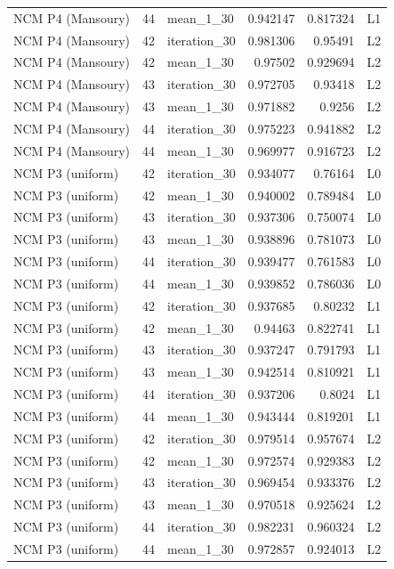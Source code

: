 \begin{table}[htbp!]
\begin{tabular}{lrlrrl}
NCM P4 (Mansoury) & 44 & mean\_1\_30 & 0.942147 & 0.817324 & L1 \\
NCM P4 (Mansoury) & 42 & iteration\_30 & 0.981306 & 0.95491 & L2 \\
NCM P4 (Mansoury) & 42 & mean\_1\_30 & 0.97502 & 0.929694 & L2 \\
NCM P4 (Mansoury) & 43 & iteration\_30 & 0.972705 & 0.93418 & L2 \\
NCM P4 (Mansoury) & 43 & mean\_1\_30 & 0.971882 & 0.9256 & L2 \\
NCM P4 (Mansoury) & 44 & iteration\_30 & 0.975223 & 0.941882 & L2 \\
NCM P4 (Mansoury) & 44 & mean\_1\_30 & 0.969977 & 0.916723 & L2 \\
NCM P3 (uniform) & 42 & iteration\_30 & 0.934077 & 0.76164 & L0 \\
NCM P3 (uniform) & 42 & mean\_1\_30 & 0.940002 & 0.789484 & L0 \\
NCM P3 (uniform) & 43 & iteration\_30 & 0.937306 & 0.750074 & L0 \\
NCM P3 (uniform) & 43 & mean\_1\_30 & 0.938896 & 0.781073 & L0 \\
NCM P3 (uniform) & 44 & iteration\_30 & 0.939477 & 0.761583 & L0 \\
NCM P3 (uniform) & 44 & mean\_1\_30 & 0.939852 & 0.786036 & L0 \\
NCM P3 (uniform) & 42 & iteration\_30 & 0.937685 & 0.80232 & L1 \\
NCM P3 (uniform) & 42 & mean\_1\_30 & 0.94463 & 0.822741 & L1 \\
NCM P3 (uniform) & 43 & iteration\_30 & 0.937247 & 0.791793 & L1 \\
NCM P3 (uniform) & 43 & mean\_1\_30 & 0.942514 & 0.810921 & L1 \\
NCM P3 (uniform) & 44 & iteration\_30 & 0.937206 & 0.8024 & L1 \\
NCM P3 (uniform) & 44 & mean\_1\_30 & 0.943444 & 0.819201 & L1 \\
NCM P3 (uniform) & 42 & iteration\_30 & 0.979514 & 0.957674 & L2 \\
NCM P3 (uniform) & 42 & mean\_1\_30 & 0.972574 & 0.929383 & L2 \\
NCM P3 (uniform) & 43 & iteration\_30 & 0.969454 & 0.933376 & L2 \\
NCM P3 (uniform) & 43 & mean\_1\_30 & 0.970518 & 0.925624 & L2 \\
NCM P3 (uniform) & 44 & iteration\_30 & 0.982231 & 0.960324 & L2 \\
NCM P3 (uniform) & 44 & mean\_1\_30 & 0.972857 & 0.924013 & L2 \\

\end{tabular}
\end{table}
